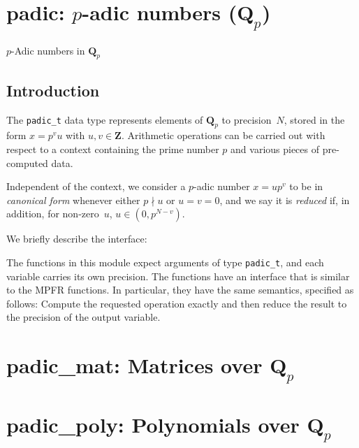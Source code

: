 \documentclass[a4paper,10pt]{book}
\newcommand{\Q}{\mathbf{Q}}%
\newcommand{\code}{\lstinline}
\begin{document}
{{\chapter{padic: $p$-adic numbers ($\Q_p$)}
\epigraph{$p$-Adic numbers in $\mathbf{Q}_p$}{}

\section{Introduction}

The \code{padic_t} data type represents elements of $\mathbf{Q}_p$ to
precision~$N$, stored in the form $x = p^v u$ with $u, v \in \mathbf{Z}$.
Arithmetic operations can be carried out with respect to a context
containing the prime number $p$ and various pieces of pre-computed data.

Independent of the context, we consider a $p$-adic number
$x = u p^v$ to be in \emph{canonical form} whenever either
$p \nmid u$ or $u = v = 0$, and we say it is \emph{reduced}
if, in addition, for non-zero~$u$, $u \in (0, p^{N-v})$.

We briefly describe the interface:

The functions in this module expect arguments of type \code{padic_t},
and each variable carries its own precision.  The functions have an
interface that is similar to the MPFR functions.  In particular, they
have the same semantics, specified as follows:  Compute the requested
operation exactly and then reduce the result to the precision of the
output variable.




\chapter{padic\_mat: Matrices over $\Q_p$}



\chapter{padic\_poly: Polynomials over $\Q_p$}


}}
\end{document}
